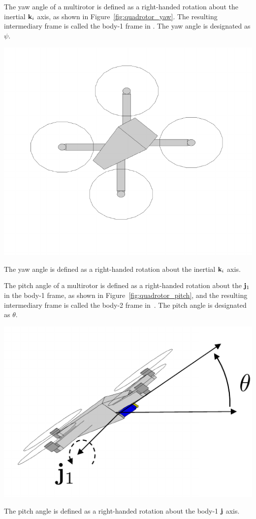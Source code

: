 The yaw angle of a multirotor is defined as a right-handed rotation about the inertial $\mathbf{k}_i$ axis, as shown in Figure~\ref{fig:quadrotor_yaw}.  The resulting intermediary frame is called the body-1 frame in \cite{BeardMcLain12}.  The yaw angle is designated as $\psi$.
\begin{marginfigure}
  \centering\includegraphics[width=\linewidth]{chap2_preliminaries/figures/quadrotor_yaw}
  \caption{The yaw angle is defined as a right-handed rotation about the inertial $\mathbf{k}_i$ axis.}
  \label{fig:quadrotor_yaw}  
\end{marginfigure}
%
The pitch angle of a multirotor is defined as a right-handed rotation about the $\mathbf{j}_1$ in the body-1 frame, as shown in Figure~\ref{fig:quadrotor_pitch}, and the resulting intermediary frame is called the body-2 frame in~\cite{BeardMcLain12}. The pitch angle is designated as $\theta$.
\begin{marginfigure}
  \centering\includegraphics[width=\linewidth]{chap2_preliminaries/figures/quadrotor_pitch}
  \caption{The pitch angle is defined as a right-handed rotation about the body-1 $\mathbf{j}$ axis.}
  \label{fig:quadrotor_pitch}  
\end{marginfigure}
